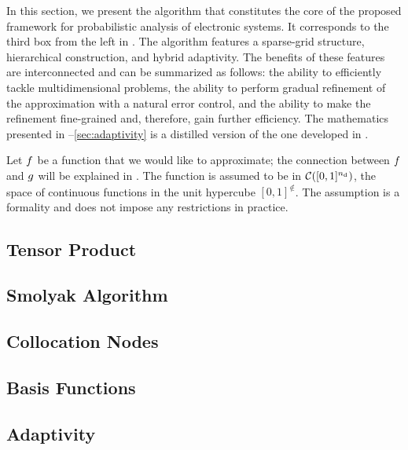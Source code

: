 In this section, we present the algorithm that constitutes the core of the
proposed framework for probabilistic analysis of electronic systems. It
corresponds to the third box from the left in . The algorithm
features a sparse-grid structure, hierarchical construction, and hybrid
adaptivity. The benefits of these features are interconnected and can be
summarized as follows: the ability to efficiently tackle multidimensional
problems, the ability to perform gradual refinement of the approximation with a
natural error control, and the ability to make the refinement fine-grained and,
therefore, gain further efficiency. The mathematics presented in
--\ref{sec:adaptivity} is a distilled version of the one developed
in \cite{jakeman2012, klimke2006, ma2009}.

Let $f$ be a function that we would like to approximate; the connection between
$f$ and $g$ will be explained in . The function is assumed to
be in $\mathcal{C}([0, 1]^{n_\text{d}})$, the space of continuous functions in the unit
hypercube $[0, 1]^\nin$. The assumption is a formality and does not impose any
restrictions in practice.

\subsection{Tensor Product} 


\subsection{Smolyak Algorithm} 



\subsection{Collocation Nodes} 


\subsection{Basis Functions} 



\subsection{Adaptivity} 


